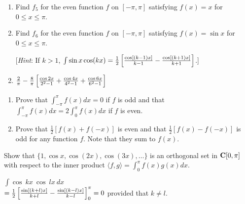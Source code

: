 \begin{multicols}{2}
\begin{ex}
\begin{enumerate}[label={\alph*.}]
\item Find $f_{5}$ for the even function $f$ on $[-\pi, \pi]$ satisfying $f(x) = x$ for $0 \leq x \leq \pi$.

\item Find $f_{6}$ for the even function $f$ on $[-\pi, \pi]$ satisfying $f(x) = \sin x$ for $0 \leq x \leq \pi$.

[\textit{Hint}: If $k > 1$, $\int \sin x \cos(kx) \\ = \tfrac{1}{2} 
\left[
\tfrac{\cos[(k - 1)x]}{k - 1} - \tfrac{\cos[(k + 1)x]}{k + 1}
\right]$.]

\end{enumerate}
\begin{sol}
\begin{enumerate}[label={\alph*.}]
\setcounter{enumi}{1}
\item  $\displaystyle
\tfrac{2}{\pi} - \tfrac{8}{\pi} \left[
\tfrac{\cos 2x}{2^2 - 1} + \tfrac{\cos 4x}{4^2 - 1} + \tfrac{\cos 6x}{6^2 - 1}
\right]$

\end{enumerate}
\end{sol}
\end{ex}

\begin{ex}
\begin{enumerate}[label={\alph*.}]
\item Prove that $\int_{-\pi}^{\pi} f(x)dx = 0$ if $f$ is odd and that $\int_{-\pi}^{\pi} f(x)dx = 2 \int_{0}^{\pi} f(x)dx$ if $f$ is even.

\item Prove that $\frac{1}{2}[f(x) + f(-x)]$ is even and that $\frac{1}{2} [f(x) - f(-x)]$ is odd for any function $f$. Note that they sum to $f(x)$.
\end{enumerate}
\end{ex}

\begin{ex}
Show that $\{1, \cos x, \cos(2x), \cos(3x), \dots\}$ is an orthogonal set in $\textbf{C}[0, \pi]$ with respect to the inner product $ \langle f, g \rangle = \int_{0}^{\pi} f(x)g(x)dx $.

\begin{sol}
$ \int \cos\ kx\ \cos\ lx\ dx $ \\ $ = \tfrac{1}{2} \left[ \tfrac{\sin[(k + l)x]}{k + l} - \tfrac{\sin[(k - l)x]}{k - l}
\right]_0^{\pi} = 0$ provided that $ k \neq l $.
\end{sol}
\end{ex}


\end{multicols}
